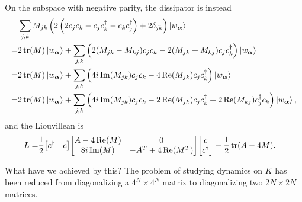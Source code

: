 On the subspace with negative parity, the dissipator is instead
\begin{align*}
	&\sum\limits_{j, k}M_{jk}\left(2\left(2c_{j}c_{k} - c_{j}c_{k}^{\dagger} - c_{k}c_{j}^{\dagger}\right) + 2\delta_{jk}\right)\ket{w_{\vb*{\alpha}}} \\
	=& 2\tr(M)\ket{w_{\vb*{\alpha}}} + \sum\limits_{j, k}\left(2(M_{jk} - M_{kj})c_{j}c_{k} - 2(M_{jk} + M_{kj})c_{j}c_{k}^{\dagger}\right)\ket{w_{\vb*{\alpha}}} \\
	=& 2\tr(M)\ket{w_{\vb*{\alpha}}} + \sum\limits_{j, k}\left(4i\Im(M_{jk})c_{j}c_{k} - 4\Re(M_{jk})c_{j}c_{k}^{\dagger}\right)\ket{w_{\vb*{\alpha}}} \\
	=& 2\tr(M)\ket{w_{\vb*{\alpha}}} + \sum\limits_{j, k}\left(4i\Im(M_{jk})c_{j}c_{k} - 2\Re(M_{jk})c_{j}c_{k}^{\dagger} + 2\Re(M_{kj})c_{j}^{\dagger} c_{k}\right)\ket{w_{\vb*{\alpha}}},
\end{align*}
and the Liouvillean is
\begin{align*}
	L =& \frac{1}{2}\mqty[
		c\adj & c
	]\mqty[
		A - 4\Re(M) & 0 \\
		8i\Im(M)    & -A^{T} + 4\Re(M^{T})
	]\mqty[
		c \\
		c\adj
	] - \frac{1}{2}\tr(A - 4M).
\end{align*}

What have we achieved by this? The problem of studying dynamics on $K$ has been reduced from diagonalizing a $4^{N}\times 4^{N}$ matrix to diagonalizing two $2N\times 2N$ matrices.

